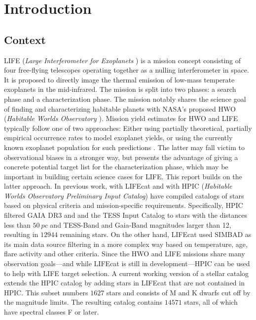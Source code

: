 \section{Introduction}
\subsection{Context}
LIFE (\textit{Large Interferometer for Exoplanets} \cite{Life1}) is a mission concept consisting of four free-flying telescopes operating together as a nulling interferometer in space. It is proposed to directly image the thermal emission of low-mass temperate exoplanets in the mid-infrared. The mission is split into two phases: a search phase and a characterization phase. The mission notably shares the science goal of finding and characterizing habitable planets with NASA's proposed HWO (\textit{Habitable Worlds Observatory} \cite{HWO}).
Mission yield estimates for HWO and LIFE typically follow one of two approaches: Either using partially theoretical, partially empirical occurrence rates to model exoplanet yields, or using the currently known exoplanet population for such predictions \cite{Life10}. The latter may fall victim to observational biases in a stronger way, but presents the advantage of giving a concrete potential target list for the characterization phase, 
 which may be important in building certain science cases for LIFE. This report builds on the latter approach.
 In previous work, \textcite{Menti_2024} with LIFEcat and \textcite{hpic} with HPIC (\textit{Habitable Worlds Observatory Preliminary Input Catalog}) have compiled catalogs of stars based on physical criteria and mission-specific requirements.
Specifically, HPIC filtered GAIA DR3 \cite{GaiaDR3Summary} and and the TESS Input Catalog \cite{TessObjectsOfInterestCatalog} to stars with the distances less than $\qty{50}{pc}$ and TESS-Band and Gaia-Band magnitudes larger than 12, resulting in $\num{12944}$ remaining stars.
On the other hand, LIFEcat used SIMBAD \cite{Simbad} as its main data source filtering in a more complex way based on temperature, age, flare activity and other criteria. 
 Since the HWO and LIFE missions share many observation goals---and while LIFEcat is still in development---HPIC can be used to help with LIFE target selection. A current working version of a stellar catalog extends the HPIC catalog by adding stars in LIFEcat that are not contained in HPIC. This subset numbers $\num{1627}$ stars and consists of M and K dwarfs cut off by the magnitude limits. The resulting catalog contains $\num{14571}$ stars, all of which have spectral classes F or later. 
